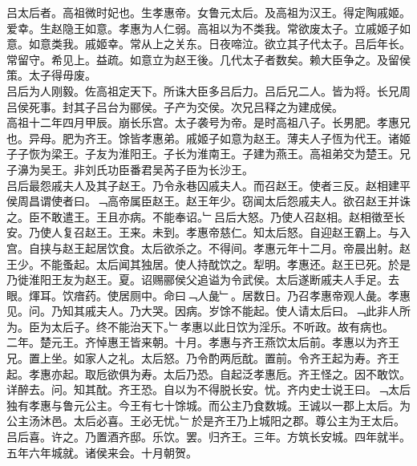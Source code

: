 \documentclass{zhvt-classic}
\begin{document}





\hspace*{2em}吕太后者。高祖微时妃也。生孝惠帝。女鲁元太后。及高祖为汉王。得定陶戚姬。爱幸。生赵隐王如意。孝惠为人仁弱。高祖以为不类我。常欲废太子。立戚姬子如意。如意类我。戚姬幸。常从上之关东。日夜啼泣。欲立其子代太子。吕后年长。常留守。希见上。益疏。如意立为赵王後。几代太子者数矣。赖大臣争之。及留侯策。太子得毋废。\\
\hspace*{2em}吕后为人刚毅。佐高祖定天下。所诛大臣多吕后力。吕后兄二人。皆为将。长兄周吕侯死事。封其子吕台为郦侯。子产为交侯。次兄吕释之为建成侯。\\
\hspace*{2em}高祖十二年四月甲辰。崩长乐宫。太子袭号为帝。是时高祖八子。长男肥。孝惠兄也。异母。肥为齐王。馀皆孝惠弟。戚姬子如意为赵王。薄夫人子恆为代王。诸姬子子恢为梁王。子友为淮阳王。子长为淮南王。子建为燕王。高祖弟交为楚王。兄子濞为吴王。非刘氏功臣番君吴芮子臣为长沙王。\\
\hspace*{2em}吕后最怨戚夫人及其子赵王。乃令永巷囚戚夫人。而召赵王。使者三反。赵相建平侯周昌谓使者曰。﹁高帝属臣赵王。赵王年少。窃闻太后怨戚夫人。欲召赵王并诛之。臣不敢遣王。王且亦病。不能奉诏。﹂吕后大怒。乃使人召赵相。赵相徵至长安。乃使人复召赵王。王来。未到。孝惠帝慈仁。知太后怒。自迎赵王霸上。与入宫。自挟与赵王起居饮食。太后欲杀之。不得间。孝惠元年十二月。帝晨出射。赵王少。不能蚤起。太后闻其独居。使人持酖饮之。犁明。孝惠还。赵王已死。於是乃徙淮阳王友为赵王。夏。诏赐郦侯父追谥为令武侯。太后遂断戚夫人手足。去眼。煇耳。饮瘖药。使居厕中。命曰﹁人彘﹂。居数日。乃召孝惠帝观人彘。孝惠见。问。乃知其戚夫人。乃大哭。因病。岁馀不能起。使人请太后曰。﹁此非人所为。臣为太后子。终不能治天下。﹂孝惠以此日饮为淫乐。不听政。故有病也。\\
\hspace*{2em}二年。楚元王。齐悼惠王皆来朝。十月。孝惠与齐王燕饮太后前。孝惠以为齐王兄。置上坐。如家人之礼。太后怒。乃令酌两卮酖。置前。令齐王起为寿。齐王起。孝惠亦起。取卮欲俱为寿。太后乃恐。自起泛孝惠卮。齐王怪之。因不敢饮。详醉去。问。知其酖。齐王恐。自以为不得脱长安。忧。齐内史士说王曰。﹁太后独有孝惠与鲁元公主。今王有七十馀城。而公主乃食数城。王诚以一郡上太后。为公主汤沐邑。太后必喜。王必无忧。﹂於是齐王乃上城阳之郡。尊公主为王太后。吕后喜。许之。乃置酒齐邸。乐饮。罢。归齐王。三年。方筑长安城。四年就半。五年六年城就。诸侯来会。十月朝贺。\\
\end{document}
